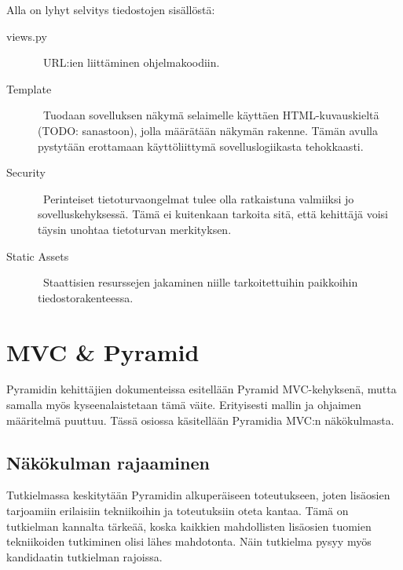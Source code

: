 \documentclass[finnish,utf8,nonumbib,palatino,kandi]{gradu2}
\begin{document}
Alla on lyhyt selvitys tiedostojen sisällöstä:
\begin{description}
\item [views.py] \ URL:ien liittäminen ohjelmakoodiin. 
\item[Template] \ Tuodaan sovelluksen näkymä selaimelle käyttäen HTML-kuvauskieltä (TODO: sanastoon), jolla määrätään näkymän rakenne. Tämän avulla pystytään erottamaan käyttöliittymä sovelluslogiikasta tehokkaasti.
\item[Security] \ Perinteiset tietoturvaongelmat tulee olla ratkaistuna valmiiksi jo sovelluskehyksessä. Tämä ei kuitenkaan tarkoita sitä, että kehittäjä voisi täysin unohtaa tietoturvan merkityksen.
\item[Static Assets] \ Staattisien resurssejen jakaminen niille tarkoitettuihin paikkoihin tiedostorakenteessa.
\end{description}


\section{MVC \& Pyramid}
Pyramidin kehittäjien dokumenteissa esitellään Pyramid MVC-kehyksenä, mutta samalla myös kyseenalaistetaan tämä väite. Erityisesti mallin ja ohjaimen määritelmä puuttuu. Tässä
osiossa käsitellään Pyramidia MVC:n näkökulmasta.  \cite{Pyramid:intr}

\subsection{Näkökulman rajaaminen}
Tutkielmassa keskitytään Pyramidin alkuperäiseen toteutukseen, joten lisäosien tarjoamiin erilaisiin tekniikoihin ja toteutuksiin oteta kantaa. Tämä on tutkielman kannalta tärkeää, koska kaikkien
mahdollisten lisäosien tuomien tekniikoiden tutkiminen olisi lähes mahdotonta. Näin tutkielma pysyy myös kandidaatin tutkielman rajoissa. 
\end{document}
